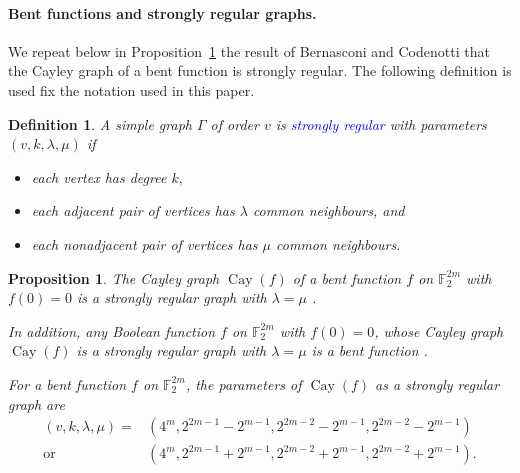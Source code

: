 \documentclass[12pt,a4paper]{article}
\newcommand{\mb}[1]{\mathbb{#1}}
\newcommand{\F}{\mb{F}}
\newcommand{\Emph}[1]{\emph{\textcolor{blue}{#1}}}
\newcommand{\Cay}[1]{\operatorname{Cay}\left(#1\right)}
\newtheorem{Proposition}{Proposition}
\newtheorem{Definition}{Definition}
\begin{document}
\paragraph*{Bent functions and strongly regular graphs.}
We repeat below in Proposition~\ref{pr-Cayley-bent-strongly-regular}
the result of Bernasconi and Codenotti \cite{BerC99}
that the Cayley graph of a bent function is strongly regular.
The following definition is used fix the notation used in this paper.
\begin{Definition}
\label{def-strongly-regular-graph}
%
A simple graph $\Gamma$ of order $v$ is \Emph{strongly regular} \cite{Bos63,BroCN89,Sei79} with
parameters
$(v,k,\lambda,\mu)$ if
\begin{itemize}
 \item
each vertex has degree $k,$
 \item
each adjacent pair of vertices has $\lambda$ common neighbours, and
\item
each nonadjacent pair of vertices has $\mu$ common neighbours.
\end{itemize}
%
\end{Definition}
%



\begin{Proposition}
\label{pr-Cayley-bent-strongly-regular}
The Cayley graph $\Cay{f}$ of a bent function $f$ on $\F_2^{2m}$
with $f(0)=0$ is a strongly regular graph with $\lambda = \mu$ \cite[Lemma 12]{BerC99}.

In addition, any Boolean function $f$ on $\F_2^{2m}$ with $f(0)=0$,
whose Cayley graph $\Cay{f}$ is a strongly regular graph with $\lambda = \mu$ is a bent function
\cite[Theorem 3]{BerCV01} \cite[Theorem 3.1]{Sta07}.

For a bent function $f$ on $\F_2^{2m}$,
the parameters of $\Cay{f}$ as a strongly regular graph
are \cite[Theorem 6.2.10]{Dil74} \cite[Theorem 3.2]{HuaY04}
\begin{align*}
(v,k,\lambda,\mu) = &(4^m, 2^{2 m - 1} - 2^{m-1}, 2^{2 m - 2} - 2^{m-1}, 2^{2 m - 2} - 2^{m-1})
\\
  \text{or} \quad &(4^m, 2^{2 m - 1} + 2^{m-1}, 2^{2 m - 2} + 2^{m-1}, 2^{2 m - 2} + 2^{m-1}).
\end{align*}
\end{Proposition}
\end{document}
